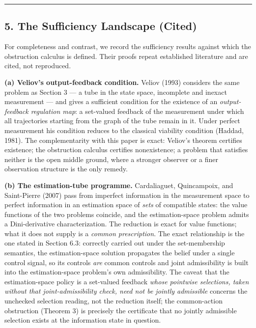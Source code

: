 \documentclass[11pt]{article}
\begin{document}
\begin{center}\rule{0.5\linewidth}{0.5pt}\end{center}

\subsection{5. The Sufficiency Landscape
(Cited)}\label{the-sufficiency-landscape-cited}

For completeness and contrast, we record the sufficiency results against
which the obstruction calculus is defined. Their proofs repeat
established literature and are cited, not reproduced.

\textbf{(a) Veliov's output-feedback condition.} Veliov (1993) considers
the same problem as Section 3 --- a tube in the state space, incomplete
and inexact measurement --- and gives a sufficient condition for the
existence of an \emph{output-feedback regulation map}: a set-valued
feedback of the measurement under which all trajectories starting from
the graph of the tube remain in it. Under perfect measurement his
condition reduces to the classical viability condition (Haddad, 1981).
The complementarity with this paper is exact: Veliov's theorem certifies
existence; the obstruction calculus certifies nonexistence; a problem
that satisfies neither is the open middle ground, where a stronger
observer or a finer observation structure is the only remedy.

\textbf{(b) The estimation-tube programme.} Cardaliaguet, Quincampoix,
and Saint-Pierre (2007) pass from imperfect information in the
measurement space to perfect information in an estimation space of
\emph{sets} of compatible states: the value functions of the two
problems coincide, and the estimation-space problem admits a
Dini-derivative characterization. The reduction is exact for value
functions; what it does not supply is a \emph{common prescription}. The
exact relationship is the one stated in Section 6.3: correctly carried
out under the set-membership semantics, the estimation-space solution
propagates the belief under a single control signal, so its controls
\emph{are} common controls and joint admissibility is built into the
estimation-space problem's own admissibility. The caveat that the
estimation-space policy is a set-valued feedback \emph{whose pointwise
selections, taken without that joint-admissibility check, need not be
jointly admissible} concerns the unchecked selection reading, not the
reduction itself; the common-action obstruction (Theorem 3) is precisely
the certificate that no jointly admissible selection exists at the
information state in question.
\end{document}
